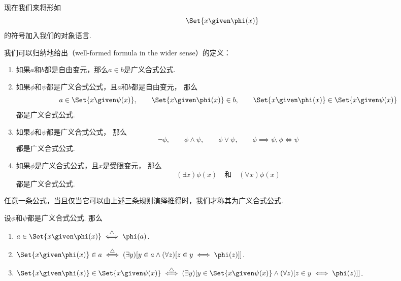 现在我们来将形如\begin{equation*}
	\Set{ x \given \phi(x) }
\end{equation*}的符号加入我们的对象语言.
\begin{definition}
我们可以归纳地给出（well-formed formula in the wider sense）的定义：
\begin{enumerate}
	\item 如果\(a\)和\(b\)都是自由变元，那么\(a \in b\)是广义合式公式.
	\item 如果\(\phi\)和\(\psi\)都是广义合式公式，且\(a\)和\(b\)都是自由变元，
	那么\begin{equation*}
		\def\A{\Set{ x \given \psi(x) }}
		\def\B{\Set{ x \given \phi(x) }}
		a \in \A, \qquad
		\B \in b, \qquad
		\B \in \A
	\end{equation*}都是广义合式公式.
	\item 如果\(\phi\)和\(\psi\)都是广义合式公式，
	那么\begin{equation*}
		\neg\phi, \qquad
		\phi\land\psi, \qquad
		\phi\lor\psi, \qquad
		\phi\implies\psi,
		\phi\iff\psi
	\end{equation*}都是广义合式公式.
	\item 如果\(\phi\)是广义合式公式，且\(x\)是受限变元，
	那么\begin{equation*}
		(\exists x)\phi(x)
		\quad\text{和}\quad
		(\forall x)\phi(x)
	\end{equation*}都是广义合式公式.
\end{enumerate}
任意一条公式，当且仅当它可以由上述三条规则演绎推得时，我们才称其为广义合式公式.
\end{definition}

\begin{definition}
设\(\phi\)和\(\psi\)都是广义合式公式.
\def\A{\Set{ x \given \phi(x) }}
\def\B{\Set{ x \given \psi(x) }}
那么\begin{enumerate}
	\item \(a \in \A \defiff \phi(a)\).
	\item \(\A \in a \defiff (\exists y)[y \in a \land (\forall z)[z \in y \iff \phi(z)]]\).
	\item \(\A \in \B \defiff (\exists y)[y \in \B \land (\forall z)[z \in y \iff \phi(z)]]\).
\end{enumerate}
\end{definition}

